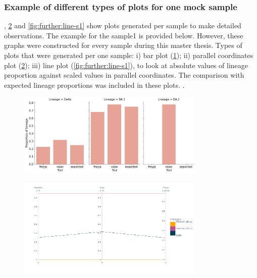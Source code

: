         \subsubsection{Example of different types of plots for one mock sample} 
        , \cref{fig:further:pc-s1} and \cref{fig:further:line-s1} show plots generated per sample to make detailed observations. The example for the sample1 is provided below. However, these graphs were constructed for every sample during this master thesis. Types of plots that were generated per one sample: i) bar plot (\cref{fig:further:bar-s1}); ii) parallel coordinates plot (\cref{fig:further:pc-s1}); iii) line plot (\cref{fig:further:line-s1}), to look at absolute values of lineage proportion against scaled values in parallel coordinates. The comparison with expected lineage proportions was included in these plots.
.
        \begin{figure}[H]
        	\centering
            \includegraphics[width=0.8\textwidth]{figures/further/bar-s1.png}
            \label{fig:further:bar-s1}
        \end{figure}
        \begin{figure}[H]
        	\centering
            \includegraphics[width=0.8\textwidth]{figures/further/pc-s1.png}
            \label{fig:further:pc-s1}
        \end{figure}
